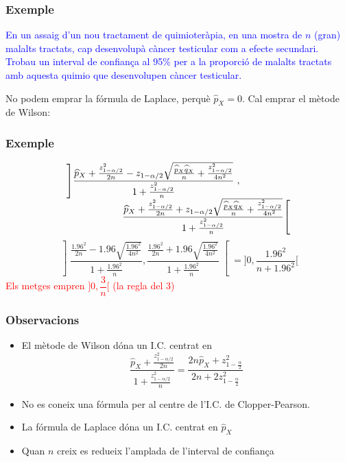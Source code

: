 \documentclass[12pt,t]{beamer}
\newcommand{\red}[1]{\textcolor{red}{#1}}
\newcommand{\blue}[1]{\textcolor{blue}{#1}}
\theoremstyle{plain}
\theoremstyle{definition}
\begin{document}
\begin{frame}
\frametitle{Exemple}

\blue{En un assaig d'un nou tractament de quimioteràpia, en una mostra de $n$ (gran) malalts tractats, cap desenvolupà càncer testicular com a efecte secundari. Trobau un interval de confiança al 95\% per a la proporció de malalts tractats amb aquesta quimio que desenvolupen càncer testicular.}
\pause\bigskip

No podem emprar la fórmula de Laplace, perquè $\widehat{p}_X=0$. Cal emprar el mètode de Wilson:


\end{frame}

\begin{frame}
\frametitle{Exemple}
\vspace*{-5ex}

{\small
$$
\begin{array}{l}
\displaystyle \left]\frac{\widehat{p}_{X}+\frac{z_{1-{\alpha}/{2}}^2}{2n}-z_{1-{\alpha}/{2}}\sqrt{\frac{\widehat{p}_{X}\widehat{q}_{X}}{n}+\frac{z_{1-{\alpha}/{2}}^2}{4n^2}}}{1+\frac{z_{1-{\alpha}/{2}}^2}{n}}\right.,\\[2ex]
\hspace*{2cm} \displaystyle \left.\frac{\widehat{p}_{X}+\frac{z_{1-{\alpha}/{2}}^2}{2n}+z_{1-{\alpha}/{2}}\sqrt{\frac{\widehat{p}_{X}\widehat{q}_{X}}{n}+\frac{z_{1-{\alpha}/{2}}^2}{4n^2}}}{1+\frac{z_{1-{\alpha}/{2}}^2}{n}}\right[
\end{array}
$$
\pause
$$
\left]\frac{\frac{1.96^2}{2n}- 1.96\sqrt{\frac{1.96^2}{4n^2}}}{1+\frac{1.96^2}{n}},
\frac{\frac{1.96^2}{2n}+ 1.96\sqrt{\frac{1.96^2}{4n^2}}}{1+\frac{1.96^2}{n}}\right[
=\Big]0,\frac{1.96^2}{n+1.96^2}\Big[
$$
}
\red{Els metges empren $\Big]0,\dfrac{3}{n}\Big[$ (la regla del 3)}


\end{frame}


\begin{frame}
\frametitle{Observacions}
\begin{itemize}
\item El mètode de Wilson dóna un I.C. centrat en
$$
\frac{\widehat{p}_{X}+\frac{z_{1-{\alpha}/{2}}^2}{2n}}{1+\frac{z_{1-{\alpha}/{2}}^2}{n}}
=\frac{2n\widehat{p}_{X}+ z_{1-\frac{\alpha}{2}}^2}{2n+2 z_{1-\frac{\alpha}{2}}^2}
$$

\item No es coneix una fórmula per al centre de l'I.C. de Clopper-Pearson.

\item La fórmula de Laplace dóna un I.C.  centrat en $\widehat{p}_{X}$
\medskip

\item Quan $n$ creix es redueix l'amplada de l'interval de confiança

\end{itemize}

\end{frame}
\end{document}
